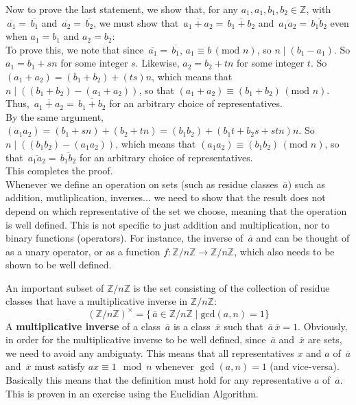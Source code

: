 \documentclass[12pt]{article}
\newcommand{\Z}{\mathbb{Z}}
\newcommand{\olsi}[1]{\,\overline{{#1}}}
\begin{document}
    Now to prove the last statement,
    we show that, for any $a_1, a_1, b_1, b_2 \in \Z$,
    with $\olsi{a_1} = \olsi{b_1}$ and  $\olsi{a_2} = \olsi{b_2}$,
    we must show that $\olsi{a_1 + a_2} = \olsi{b_1 + b_2}$
    and  $\olsi{a_1a_2} = \olsi{b_1b_2}$
    even when $a_1 = b_1$ and $a_2 = b_2$: \\
    To prove this, we note that since $\olsi{a_1} = \olsi{b_1}$,
    $a_1 \equiv b \, (\text{mod } n)$,
    so $n \mid (b_1 - a_1)$. So $a_1 = b_1 + sn$ for some integer $s$.
    Likewise, $a_2 = b_2 + tn$ for some integer $t$.
    So $(a_1 + a_2) = (b_1 + b_2) + (ts)n$,
    which means that $n \mid ((b_1 + b_2) - (a_1 + a_2))$,
    so that $(a_1 + a_2) \equiv (b_1 + b_2) \, (\text{mod } n)$.
    Thus, $\olsi{a_1 + a_2} = \olsi{b_1 + b_2}$ for an arbitrary
    choice of representatives. \\
    By the same argument,
    $(a_1a_2) = (b_1 + sn) + (b_2 + tn) = (b_1b_2) + (b_1t+b_2s + stn)n$.
    So $n \mid ((b_1b_2) - (a_1a_2))$,
    which means that $(a_1a_2) \equiv (b_1b_2) \, (\text{mod } n)$,
    so that $\olsi{a_1a_2} = \olsi{b_1b_2}$ for an arbitrary
    choice of representatives. \\
    This completes the proof. \\

    Whenever we define an operation on sets
    (such as residue classes $\olsi{a}$)
    such as addition, mutliplication, inverses...
    we need to show that the result does not depend on which
    representative of the set we choose,
    meaning that the operation is well defined.
    This is not specific to just addition and multiplication,
    nor to binary functions (operators).
    For instance, the inverse of $\olsi{a}$
    and can be thought of as a unary operator,
    or as a function $f: \Z/n\Z \to \Z/n\Z$,
    which also needs to be shown to be well defined.

    An important subset of $\Z/n\Z$
    is the set consisting of the collection of residue classes
    that have a multiplicative inverse in $\Z/n\Z$:
    \[ (\Z/n\Z)^\times
    = \{ \olsi{a} \in \Z/n\Z \mid \text{gcd}(a, n) = 1 \} \]
    A \textbf{multiplicative inverse} of a class $\olsi{a}$
    is a class $\olsi{x}$ such that $\olsi{a}\olsi{x} = 1$.
    Obviously, in order for the multiplicative
    inverse to be well defined,
    since $\olsi{a}$ and $\olsi{x}$ are sets,
    we need to avoid any ambiguaty.
    This means that all representatives
    $x$ and $a$ of $\olsi{a}$ and $\olsi{x}$
    must satisfy $ax \equiv 1 \mod n$
    whenever $\gcd(a, n) = 1$
    (and vice-versa).
    Basically this means that the definition must hold
    for any representative $a$ of $\olsi{a}$. \\
    This is proven in an exercise using the Euclidian Algorithm. \\
    
\end{document}
